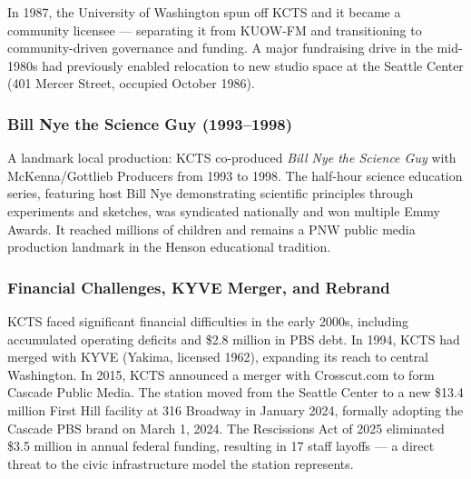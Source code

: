 \documentclass[11pt,letterpaper]{article}
\begin{document}
In 1987, the University of Washington spun off KCTS and it became a community licensee --- separating it from KUOW-FM and transitioning to community-driven governance and funding. A major fundraising drive in the mid-1980s had previously enabled relocation to new studio space at the Seattle Center (401 Mercer Street, occupied October 1986).

\subsubsection{Bill Nye the Science Guy (1993--1998)}

A landmark local production: KCTS co-produced \textit{Bill Nye the Science Guy} with McKenna/Gottlieb Producers from 1993 to 1998. The half-hour science education series, featuring host Bill Nye demonstrating scientific principles through experiments and sketches, was syndicated nationally and won multiple Emmy Awards. It reached millions of children and remains a PNW public media production landmark in the Henson educational tradition.

\subsubsection{Financial Challenges, KYVE Merger, and Rebrand}

KCTS faced significant financial difficulties in the early 2000s, including accumulated operating deficits and \$2.8 million in PBS debt. In 1994, KCTS had merged with KYVE (Yakima, licensed 1962), expanding its reach to central Washington. In 2015, KCTS announced a merger with Crosscut.com to form Cascade Public Media. The station moved from the Seattle Center to a new \$13.4 million First Hill facility at 316 Broadway in January 2024, formally adopting the Cascade PBS brand on March 1, 2024. The Rescissions Act of 2025 eliminated \$3.5 million in annual federal funding, resulting in 17 staff layoffs --- a direct threat to the civic infrastructure model the station represents.
\end{document}

